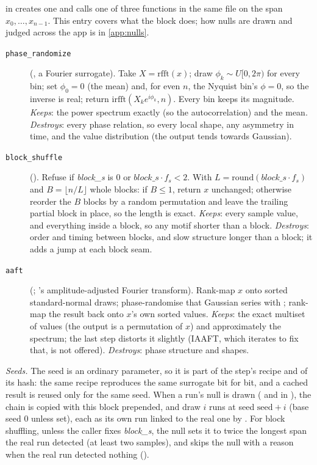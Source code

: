  in  creates one
 and calls one of three functions in the same file on
the span $x_0,\dots,x_{n-1}$. This entry covers what the block does; how nulls are drawn
and judged across the app is in \cref{app:nulls}.

\begin{description}
\item[\texttt{phase\_randomize}] (, a Fourier surrogate). Take
  $X = \mathrm{rfft}(x)$; draw $\phi_k \sim U[0, 2\pi)$ for every bin; set $\phi_0 = 0$ (the
  mean) and, for even $n$, the Nyquist bin's $\phi = 0$, so the inverse is real; return
  $\mathrm{irfft}(X_k e^{i\phi_k}, n)$. Every bin keeps its magnitude.
  \emph{Keeps}: the power spectrum exactly (so the autocorrelation) and the mean.
  \emph{Destroys}: every phase relation, so every local shape, any asymmetry in time, and the
  value distribution (the output tends towards Gaussian).
\item[\texttt{block\_shuffle}] (). Refuse if \emph{block\_s} is 0 or
  $\textit{block\_s}\cdot f_s < 2$. With $L = \mathrm{round}(\textit{block\_s}\cdot f_s)$ and
  $B = \lfloor n/L \rfloor$ whole blocks: if $B \le 1$, return $x$ unchanged; otherwise
  reorder the $B$ blocks by a random permutation and leave the trailing partial block in
  place, so the length is exact.
  \emph{Keeps}: every sample value, and everything inside a block, so any motif shorter than a
  block. \emph{Destroys}: order and timing between blocks, and slow structure longer than a
  block; it adds a jump at each block seam.
\item[\texttt{aaft}] (; \citet{theiler1992testing}'s amplitude-adjusted
  Fourier transform). Rank-map $x$ onto sorted standard-normal draws; phase-randomise that
  Gaussian series with ; rank-map the result back onto $x$'s own
  sorted values. \emph{Keeps}: the exact multiset of values (the output is a permutation of
  $x$) and approximately the spectrum; the last step distorts it slightly (IAAFT, which
  iterates to fix that, is not offered). \emph{Destroys}: phase structure and shapes.
\end{description}

\emph{Seeds.} The seed is an ordinary parameter, so it is part of the step's recipe and of
its hash: the same recipe reproduces the same surrogate bit for bit, and a cached result is
reused only for the same seed. When a run's null is drawn ( and
 in ), the chain is copied with this
block prepended, and draw $i$ runs at seed $\text{seed} + i$ (base seed 0 unless set), each
as its own run linked to the real one by . For block
shuffling, unless the caller fixes \emph{block\_s}, the null sets it to twice the longest
span the real run detected (at least two samples), and skips the null with a reason when the
real run detected nothing ().


